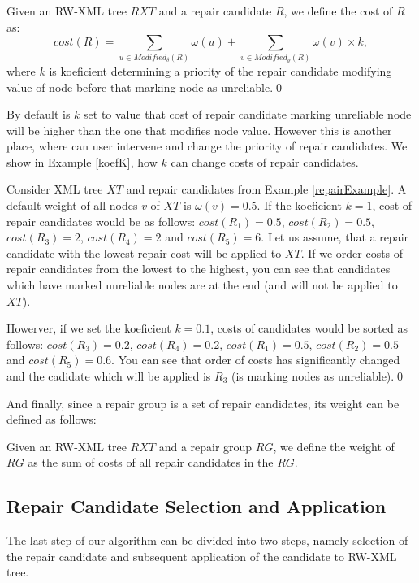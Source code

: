 \begin{define}
Given an RW-XML tree $RXT$ and a repair candidate $R$, we define the cost of $R$ as:
$$cost(R) = \sum_{u \in Modified_\delta(R)} \omega(u) + \sum_{v \in Modified_\varrho(R)} \omega(v) \times k,$$
where $k$ is koeficient determining a priority of the repair candidate modifying value of node before that  marking node as unreliable.\qed
\end{define}

By default is $k$ set to value that cost of repair candidate marking unreliable node will be higher than the one that modifies node value. However this is another place, where can user intervene and change the priority of repair candidates. We show in Example \ref{koefK}, how $k$ can change costs of repair candidates.

\begin{example}\label{koefK}
Consider XML tree $XT$ and repair candidates from Example \ref{repairExample}. A default weight of all nodes $v$ of $XT$ is $\omega(v) = 0.5$. If the koeficient $k = 1$, cost of repair candidates would be as follows: $cost(R_1) = 0.5$, $cost(R_2) = 0.5$, $cost(R_3) = 2$, $cost(R_4) = 2$ and $cost(R_5) = 6$.
Let us assume, that a repair candidate with the lowest repair cost will be applied to $XT$. If we order costs of repair candidates from the lowest to the highest, you can see that candidates which have marked unreliable nodes are at the end (and will not be applied to $XT$).

Howerver, if we set the koeficient $k = 0.1$, costs of candidates would be sorted as follows: $cost(R_3) = 0.2$, $cost(R_4) = 0.2$, $cost(R_1) = 0.5$, $cost(R_2)  = 0.5$ and $cost(R_5) = 0.6$. You can see that order of costs has significantly changed and the cadidate which will be applied is $R_3$ (is marking nodes as unreliable).\qed
\end{example}

And finally, since a repair group is a set of repair candidates, its weight can be defined as follows:

\begin{define}
Given an RW-XML tree $RXT$ and a repair group $RG$, we define the weight of $RG$ as the sum of costs of all repair candidates in the $RG$.
\end{define}

\subsection{Repair Candidate Selection and Application}

The last step of our algorithm can be divided into two steps, namely selection of the repair candidate and subsequent application of the candidate to RW-XML tree.

